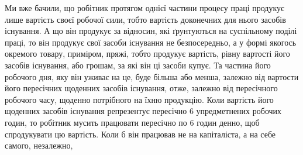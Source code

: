 Ми вже бачили, що робітник протягом однієї частини процесу праці продукує лише вартість своєї
робочої сили, тобто вартість доконечних для нього засобів існування. А що він продукує за відносин,
які ґрунтуються на суспільному поділі праці, то він продукує свої засоби існування не безпосередньо,
а у формі якогось окремого товару, приміром, пряжі, тобто продукує вартість, рівну вартості його
засобів існування, або грошам, за які
він ці засоби купує. Та частина його робочого дня, яку він уживає на це, буде більша або менша,
залежно від вартости його пересічних щоденних засобів існування, отже, залежно від пересічного
робочого часу, щоденно потрібного на їхню продукцію. Коли вартість його щоденних засобів існування
репрезентує пересічно
6 упредметнених робочих годин, то робітник мусить працювати пересічно по 6 годин денно, щоб
спродукувати цю вартість. Коли б він працював не на капіталіста, а на себе самого, незалежно,
\parbreak{}  %
